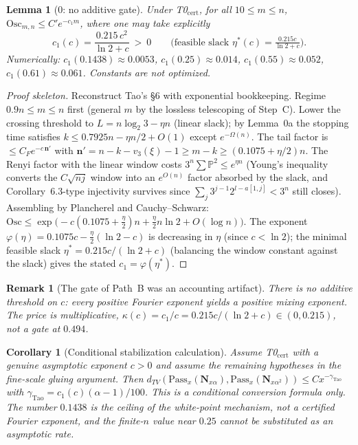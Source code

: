 \documentclass[12pt,a4paper]{article}
\newtheorem{lemma}[theorem]{Lemma}
\newtheorem{corollary}[theorem]{Corollary}
\newtheorem{remark}[theorem]{Remark}
\begin{document}
\begin{lemma}[0: no additive gate]
Under T0$_{\mathrm{cert}}$, for all $10\le m\le n$,
$\mathrm{Osc}_{m,n}\le C'e^{-c_1m}$, where one may take explicitly
\[
c_1(c)=\frac{0.215\,c^2}{\ln2+c}\ >\ 0
\qquad\big(\text{feasible slack }\eta^*(c)=\tfrac{0.215c}{\ln2+c}\big).
\]
Numerically: $c_1(0.1438)\approx0.0053$, $c_1(0.25)\approx0.014$,
$c_1(0.55)\approx0.052$, $c_1(0.61)\approx0.061$. Constants are not optimized.
\end{lemma}
\begin{proof}[Proof skeleton]
Reconstruct Tao's \S6 with exponential bookkeeping. Regime $0.9n\le m\le n$
first (general $m$ by the lossless telescoping of Step~C). Lower the crossing
threshold to $L=n\log_2 3-\eta n$ (linear slack); by Lemma~0a the stopping time
satisfies $k\le0.7925n-\eta n/2+O(1)$ except $e^{-\Omega(n)}$. The tail factor
is $\le C_Fe^{-c\,\mathbf n'}$ with
$\mathbf n'=n-k-v_3(\xi)-1\ge m-k\ge(0.1075+\eta/2)n$. The Renyi factor with
the linear window costs $3^n\sum\mathbb P^2\le e^{\eta n}$ (Young's inequality
converts the $C\sqrt{nj}$ window into an $e^{O(n)}$ factor absorbed by the
slack, and Corollary~6.3-type injectivity survives since
$\sum_j3^{j-1}2^{l-a[1,j]}<3^n$ still closes). Assembling by Plancherel and
Cauchy--Schwarz:
$\mathrm{Osc}\le\exp\big(-c(0.1075+\tfrac\eta2)n+\tfrac\eta2n\ln2+O(\log n)\big)$.
The exponent $\varphi(\eta)=0.1075c-\tfrac\eta2(\ln2-c)$ is decreasing in
$\eta$ (since $c<\ln2$); the minimal feasible slack
$\eta^*=0.215c/(\ln2+c)$ (balancing the window constant against the slack)
gives the stated $c_1=\varphi(\eta^*)$.
\end{proof}

\begin{remark}[The gate of Path~B was an accounting artifact]
There is no additive threshold on $c$: every positive Fourier exponent yields
a positive mixing exponent. The price is multiplicative,
$\kappa(c)=c_1/c=0.215c/(\ln2+c)\in(0,0.215)$, not a gate at $0.494$.
\end{remark}

\begin{corollary}[Conditional stabilization calculation]
Assume T0$_{\mathrm{cert}}$ with a genuine asymptotic exponent $c>0$ and assume
the remaining hypotheses in the fine-scale gluing argument.  Then
$d_{TV}(\mathrm{Pass}_x(\mathbf N_{x\alpha}),\mathrm{Pass}_x(\mathbf N_{x\alpha^2}))
\le Cx^{-\gamma_{\mathrm{Tao}}}$ with
$\gamma_{\mathrm{Tao}}=c_1(c)(\alpha-1)/100$.  This is a conditional conversion
formula only.  The number $0.1438$ is the ceiling of the white-point mechanism,
not a certified Fourier exponent, and the finite-$n$ value near $0.25$ cannot
be substituted as an asymptotic rate.
\end{corollary}
\end{document}
